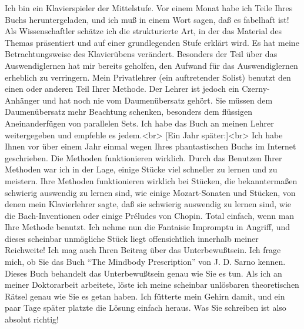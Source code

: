 \item \hypertarget{testimonials20}{}
Ich bin ein Klavierspieler der Mittelstufe.
Vor einem Monat habe ich Teile Ihres Buchs heruntergeladen, und ich muß in einem Wort sagen, daß es fabelhaft ist!
Als Wissenschaftler schätze ich die strukturierte Art, in der das Material des Themas präsentiert und auf einer grundlegenden Stufe erklärt wird.
Es hat meine Betrachtungsweise des Klavierübens verändert.
Besonders der Teil über das Auswendiglernen hat mir bereits geholfen, den Aufwand für das Auswendiglernen erheblich zu verringern.
Mein Privatlehrer (ein auftretender Solist) benutzt den einen oder anderen Teil Ihrer Methode.
Der Lehrer ist jedoch ein Czerny-Anhänger und hat noch nie vom Daumenübersatz gehört.
Sie müssen dem Daumenübersatz mehr Beachtung schenken, besonders dem flüssigen Aneinanderfügen von parallelen Sets.
Ich habe das Buch an meinen Lehrer weitergegeben und empfehle es jedem.<br>
[Ein Jahr später:]<br>
Ich habe Ihnen vor über einem Jahr einmal wegen Ihres phantastischen Buchs im Internet geschrieben.
Die Methoden funktionieren wirklich.
Durch das Benutzen Ihrer Methoden war ich in der Lage, einige Stücke viel schneller zu lernen und zu meistern.
Ihre Methoden funktionieren wirklich bei Stücken, die bekanntermaßen schwierig auswendig zu lernen sind, wie einige Mozart-Sonaten und Stücken, von denen mein Klavierlehrer sagte, daß sie schwierig auswendig zu lernen sind, wie die Bach-Inventionen oder einige Préludes von Chopin.
Total einfach, wenn man Ihre Methode benutzt.
Ich nehme nun die Fantaisie Impromptu in Angriff, und dieses scheinbar unmögliche Stück liegt offensichtlich innerhalb meiner Reichweite!
Ich mag auch Ihren Beitrag über das Unterbewußtsein.
Ich frage mich, ob Sie das Buch \enquote{The Mindbody Prescription} von J. D. Sarno kennen.
Dieses Buch behandelt das Unterbewußtsein genau wie Sie es tun.
Als ich an meiner Doktorarbeit arbeitete, löste ich meine scheinbar unlösbaren theoretischen Rätsel genau wie Sie es getan haben.
Ich fütterte mein Gehirn damit, und ein paar Tage später platzte die Lösung einfach heraus.
Was Sie schreiben ist also absolut richtig!


